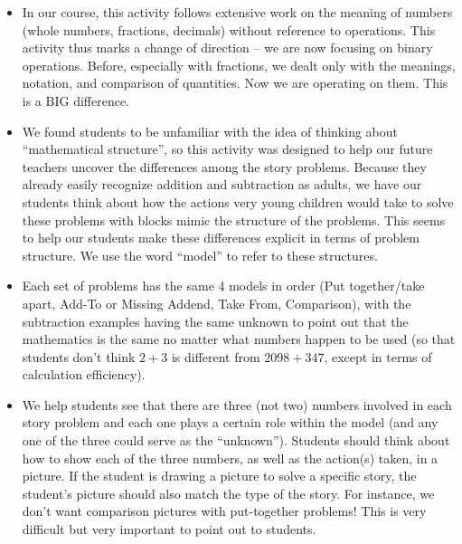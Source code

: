 \documentclass{ximera}
\begin{document}
\begin{instructorNotes}
\begin{itemize}
	\item In our course, this activity follows extensive work on the meaning of numbers (whole numbers, fractions, decimals) without reference to operations.  This activity thus marks a change of direction -- we are now focusing on binary operations. Before, especially with fractions, we dealt only with the meanings, notation, and comparison of quantities.  Now we are operating on them. This is a BIG difference.
	\item We found students to be unfamiliar with the idea of thinking about ``mathematical structure'', so this activity was designed to help our future teachers uncover the differences among the story problems.  Because they already easily recognize addition and subtraction as adults, we have our students think about how the actions very young children would take to solve these problems with blocks mimic the structure of the problems. This seems to help our students make these differences explicit in terms of problem structure.  We use the word ``model'' to refer to these structures.
	\item Each set of problems has the same 4 models in order (Put together/take apart, Add-To or Missing Addend, Take From, Comparison), with the subtraction examples having the same unknown to point out that the mathematics is the same no matter what numbers happen to be used (so that students don't think $2+3$ is different from $2098+347$, except in terms of calculation efficiency).
	\item We help students see that there are three (not two) numbers involved in each story problem and each one plays a certain role within the model (and any one of the three could serve as the ``unknown'').  Students should think about how to show each of the three numbers, as well as the action(s) taken, in a picture.  If the student is drawing a picture to solve a specific story, the student's picture should also match the type of the story. For instance, we don't want comparison pictures with put-together problems! This is very difficult but very important to point out to students.

\end{itemize}
\end{instructorNotes}
\end{document}
